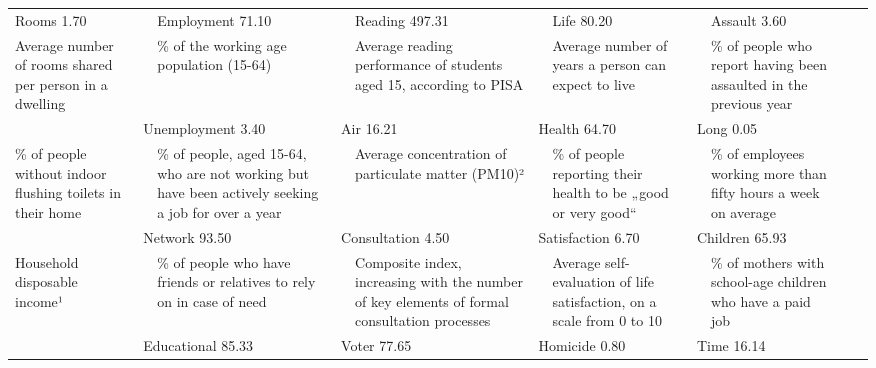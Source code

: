 \documentclass{article}
\newcommand{\tabitem}[1]{{\fontspec[Color=808080, Scale=1.1]{Lato Bold} #1}}
\newcommand{\tabzahl}[1]{{\fontspec[Color=808080, Scale=1.1]{Lato Bold} #1}}
\begin{document}
\pagestyle{empty}
\setlength{\tabcolsep}{0.35cm}
\footnotesize
 \begin{tabular}{p{4.3cm}p{0.1cm}p{4.3cm}p{0.1cm}p{4.3cm}p{0.1cm}p{4.3cm}p{0.1cm}p{4.3cm}p{0.1cm}p{0.1cm}}
\toprule
\multicolumn{2}{l}{ \tabitem{Rooms} \hfill \tabzahl{1.70}} & \multicolumn{2}{l}{\tabitem{Employment} \hfill \tabzahl{71.10}} & \multicolumn{2}{l}{\tabitem{Reading} \hfill \tabzahl{497.31}} & \multicolumn{2}{l}{\tabitem{Life} \hfill \tabzahl{80.20}} & \multicolumn{2}{l}{\tabitem{Assault} \hfill \tabzahl{3.60}}& 
\tabularnewline
\raggedright Average number of rooms shared per person in a dwelling &  & \% of the working age population (15-64) &  & \raggedright Average reading performance of students aged 15, according to PISA &  & \raggedright Average number of years a person can expect to live &  & \raggedright \% of people who report having been assaulted in the previous year& 
\tabularnewline
\addlinespace
\multicolumn{2}{l}{\tabitem{Dwelling} \hfill \tabzahl{1.20}} & \multicolumn{2}{l}{\tabitem{Unemployment} \hfill \tabzahl{3.40}} & \multicolumn{2}{l}{\tabitem{Air} \hfill \tabzahl{16.21}} & \multicolumn{2}{l}{\tabitem{Health} \hfill \tabzahl{64.70}} & \multicolumn{2}{l}{\tabitem{Long} \hfill \tabzahl{0.05}}& 
\tabularnewline
\raggedright \% of people without indoor flushing toilets in their home &  & \raggedright \% of people, aged 15-64, who are not working but have been actively seeking a job for over a year &  &  \raggedright Average concentration of particulate matter (PM10)² &  & \raggedright \% of people reporting their health to be „good or very good“ &  & \raggedright \% of employees working more than fifty hours a week on average& 
\tabularnewline
\addlinespace
\multicolumn{2}{l}{\tabitem{Income} \hfill \tabzahl{27664.72}} & \multicolumn{2}{l}{\tabitem{Network} \hfill \tabzahl{93.50}} & \multicolumn{2}{l}{\tabitem{Consultation} \hfill \tabzahl{4.50}} & \multicolumn{2}{l}{\tabitem{Satisfaction} \hfill \tabzahl{6.70}} & \multicolumn{2}{l}{\tabitem{Children} \hfill \tabzahl{65.93}}& 
\tabularnewline
\raggedright Household disposable income¹  & & \raggedright \% of people who have friends or relatives to rely on in case of need &  & \raggedright Composite index, increasing with the number of key elements of formal consultation processes &  & \raggedright Average self-evaluation of life satisfaction, on a scale from 0 to 10 &  & \raggedright \% of mothers with school-age children who have a paid job& 
\tabularnewline
\addlinespace
\multicolumn{2}{l}{\tabitem{Wealth} \hfill \tabzahl{45113.30}} & \multicolumn{2}{l}{\tabitem{Educational} \hfill \tabzahl{85.33}} & \multicolumn{2}{l}{\tabitem{Voter} \hfill \tabzahl{77.65}} & \multicolumn{2}{l}{\tabitem{Homicide} \hfill \tabzahl{0.80}} & \multicolumn{2}{l}{\tabitem{Time} \hfill \tabzahl{16.14}}& 

\end{tabular}
\end{document}

